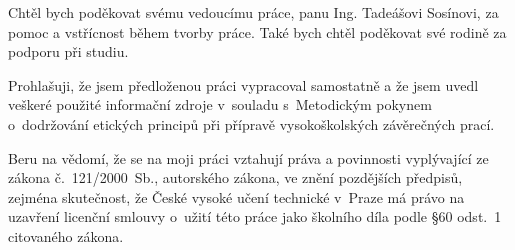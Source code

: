 \documentclass[czech,master,unicode,draft]{ctufit-thesis}
\theoremstyle{plain}
\theoremstyle{definition}
\theoremstyle{remark}
\numberwithin{theorem}{chapter}
\begin{document}
 
\frontmatter\frontmatterinit %


\thispagestyle{empty}\cleardoublepage\maketitle %

\imprintpage %

\tableofcontents %
\listoffigures %
\begingroup
\let\clearpage\relax
\listoflistings %
\endgroup

\begin{acknowledgmentpage}
	Chtěl bych poděkovat svému vedoucímu práce, panu Ing. Tadeášovi Sosínovi, za pomoc a vstřícnost během tvorby práce. Také bych chtěl poděkovat své rodině za podporu při studiu.
\end{acknowledgmentpage} 


\begin{declarationpage}
Prohlašuji, že jsem předloženou práci vypracoval samostatně a že jsem uvedl veškeré použité informační zdroje v~souladu s~Metodickým pokynem o~dodržování etických principů při přípravě vysokoškolských závěrečných prací.

Beru na vědomí, že se na moji práci vztahují práva a povinnosti vyplývající ze zákona č.~121/2000~Sb., autorského zákona, ve znění pozdějších předpisů, zejména skutečnost, že České vysoké učení technické v~Praze má právo na uzavření licenční smlouvy o~užití této práce jako školního díla podle §60 odst.~1 citovaného zákona.
\end{declarationpage}
\end{document}
